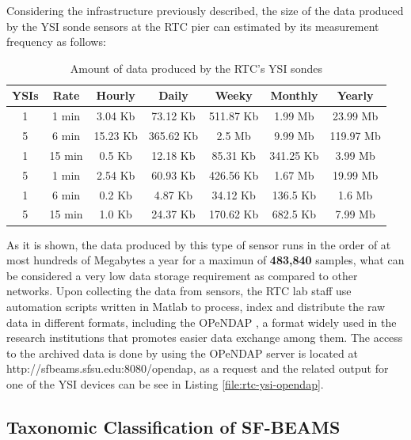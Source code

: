 Considering the infrastructure previously described, the size of the data
produced by the YSI sonde sensors at the RTC pier can estimated by its
measurement frequency as follows:

\begin{table}
    \label{tab:ysi-data-distribution}
    \caption{Amount of data produced by the RTC's YSI sondes}
        \begin{center}
        \begin{tabular}{|c|c|c|c|c|c|c|}\hline 
        \textbf{YSIs} & \textbf{Rate} & \textbf{Hourly} & \textbf{Daily} &
        \textbf{Weeky} & \textbf{Monthly} & \textbf{Yearly}\\\hline 
        1 & 1 min & 3.04 Kb & 73.12 Kb & 511.87 Kb & 1.99 Mb & 23.99 Mb\\\hline 
        5 & 6 min & 15.23 Kb & 365.62 Kb & 2.5 Mb & 9.99 Mb & 119.97 Mb\\\hline 
        1 & 15 min & 0.5 Kb & 12.18 Kb & 85.31 Kb & 341.25 Kb & 3.99 Mb\\\hline 
        5 & 1 min & 2.54 Kb & 60.93 Kb & 426.56 Kb & 1.67 Mb & 19.99 Mb\\\hline
        1 & 6 min & 0.2 Kb & 4.87 Kb & 34.12 Kb & 136.5 Kb & 1.6 Mb\\\hline 
        5 & 15 min & 1.0 Kb & 24.37 Kb & 170.62 Kb & 682.5 Kb & 7.99 Mb\\\hline
        \end{tabular}
        \end{center}
\end{table}

As it is shown, the data produced by this type of sensor runs in the order of
at most hundreds of Megabytes a year for a maximun of \textbf{483,840} samples,
what can be considered a very low data storage requirement as compared to
other networks. Upon collecting the data from sensors, the RTC lab staff use
automation scripts written in Matlab to process, index and distribute the raw
data in different formats, including the OPeNDAP \cite{opendap}, a format
widely used in the research institutions that promotes easier data exchange
among them. The access to the archived data is done by using the OPeNDAP
server is located at http://sfbeams.sfsu.edu:8080/opendap, as a request and
the related output for one of the YSI devices can be see in Listing
\ref{file:rtc-ysi-opendap}.

\subsection{Taxonomic Classification of SF-BEAMS}

